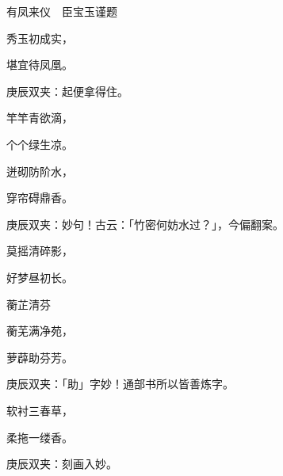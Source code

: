 \begin{poem}
    \begin{pl}有凤来仪　臣宝玉谨题\end{pl}

    \begin{pl}秀玉初成实，\end{pl}

    \begin{pl}堪宜待凤凰。\end{pl}\begin{note}庚辰双夹：起便拿得住。\end{note}

    \begin{pl}竿竿青欲滴，\end{pl}

    \begin{pl}个个绿生凉。\end{pl}

    \begin{pl}迸砌防阶水，\end{pl}

    \begin{pl}穿帘碍鼎香。\end{pl}\begin{note}庚辰双夹：妙句！古云：「竹密何妨水过？」，今偏翻案。\end{note}

    \begin{pl}莫摇清碎影，\end{pl}

    \begin{pl}好梦昼初长。\end{pl}

    \begin{pl}蘅芷清芬\end{pl}

    \begin{pl}蘅芜满净苑，\end{pl}

    \begin{pl}萝薜助芬芳。\end{pl}\begin{note}庚辰双夹：「助」字妙！通部书所以皆善炼字。\end{note}

    \begin{pl}软衬三春草，\end{pl}

    \begin{pl}柔拖一缕香。\end{pl}\begin{note}庚辰双夹：刻画入妙。\end{note}


\end{poem}
